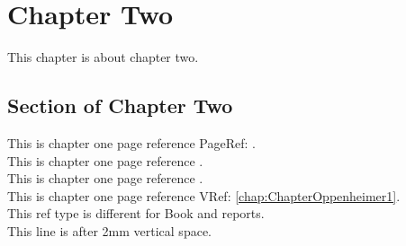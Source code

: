 \documentclass[a4paper, 10pt]{report}
\begin{document}
\chapter[Just Chapter Two]{Chapter Two} \label{chap:Chapter2}
This chapter is about chapter two.
\section{Section of Chapter Two}
This is chapter one page reference PageRef: \pageref{chap:ChapterOppenheimer1}. \\
This is chapter one page reference . \\
This is chapter one page reference . \\
This is chapter one page reference VRef: \vref{chap:ChapterOppenheimer1}. \\
This ref type is different for Book and reports. \\[2mm]
This line is after 2mm vertical space. \\
\end{document}
